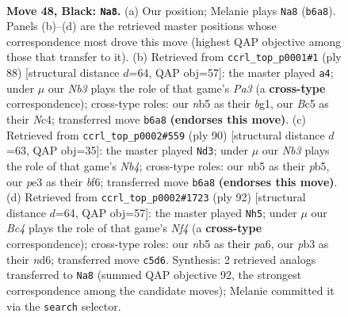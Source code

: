 \documentclass[11pt]{article}
\begin{document}
\clearpage

\begin{figure}[p]\centering
\begin{subfigure}{0.46\textwidth}\centering
\resizebox{\linewidth}{!}{%
\newchessgame
\chessboard[
  setfen={1nb5/1p4k1/1n6/pNbp2p1/7p/PP2P2P/3BP1K1/3B4 b - - 9 48},
  showmover=false,
  pgfstyle=straightmove, color=movearrow, markmove={b6-a8}
]}
\caption{}
\end{subfigure}\hfill
\begin{subfigure}{0.46\textwidth}\centering
\resizebox{\linewidth}{!}{%
\newchessgame
\chessboard[
  setfen={8/3bk1p1/1p2p3/pP2P2p/2N1Bp1P/P7/4K1P1/6b1 w - - 3 45},
  showmover=false,
  pgfstyle=straightmove, color=movearrow, markmove={a3-a4}
]}
\caption{}
\end{subfigure}
\\[4pt]
\begin{subfigure}{0.46\textwidth}\centering
\resizebox{\linewidth}{!}{%
\newchessgame
\chessboard[
  setfen={4k3/1b3p2/4pbp1/np6/1N2P2p/P4P1P/B1K3P1/4B3 w - - 6 46},
  showmover=false,
  pgfstyle=straightmove, color=movearrow, markmove={b4-d3}
]}
\caption{}
\end{subfigure}\hfill
\begin{subfigure}{0.46\textwidth}\centering
\resizebox{\linewidth}{!}{%
\newchessgame
\chessboard[
  setfen={8/4k1p1/p1bn1pP1/1p1p1p2/3P1N2/PP1BPK2/8/8 w - - 5 47},
  showmover=false,
  pgfstyle=straightmove, color=movearrow, markmove={f4-h5}
]}
\caption{}
\end{subfigure}
\caption{\textbf{Move 48, Black: \texttt{Na8}.} (a) Our position; Melanie plays \texttt{Na8} (\texttt{b6a8}). Panels (b)--(d) are the retrieved master positions whose correspondence most drove this move (highest QAP objective among those that transfer to it). (b) Retrieved from \texttt{ccrl\_top\_p0001\#1} (ply 88) [structural distance $d$=64, QAP obj=57]: the master played \texttt{a4}; under $\mu$ our \emph{Nb3} plays the role of that game's \emph{Pa3} (a \textbf{cross-type} correspondence); cross-type roles: our \emph{n}b5 as their \emph{b}g1, our \emph{B}c5 as their \emph{N}c4; transferred move \texttt{b6a8} \textbf{(endorses this move)}. (c) Retrieved from \texttt{ccrl\_top\_p0002\#559} (ply 90) [structural distance $d$=63, QAP obj=35]: the master played \texttt{Nd3}; under $\mu$ our \emph{Nb3} plays the role of that game's \emph{Nb4}; cross-type roles: our \emph{n}b5 as their \emph{p}b5, our \emph{p}e3 as their \emph{b}f6; transferred move \texttt{b6a8} \textbf{(endorses this move)}. (d) Retrieved from \texttt{ccrl\_top\_p0002\#1723} (ply 92) [structural distance $d$=64, QAP obj=57]: the master played \texttt{Nh5}; under $\mu$ our \emph{Bc4} plays the role of that game's \emph{Nf4} (a \textbf{cross-type} correspondence); cross-type roles: our \emph{n}b5 as their \emph{p}a6, our \emph{p}b3 as their \emph{n}d6; transferred move \texttt{c5d6}. Synthesis: 2 retrieved analogs transferred to \texttt{Na8} (summed QAP objective 92, the strongest correspondence among the candidate moves); Melanie committed it via the \texttt{search} selector.}
\label{fig:thought-m95}
\end{figure}
\end{document}
